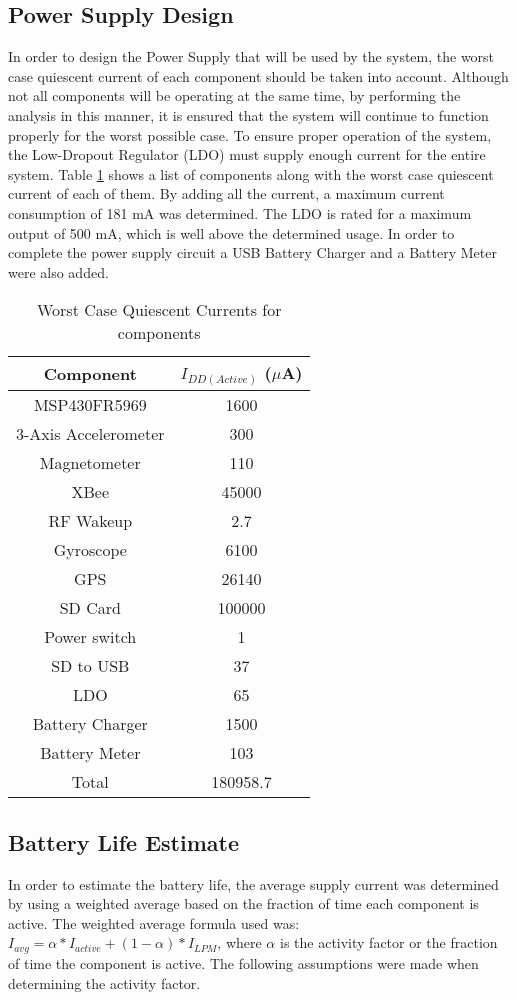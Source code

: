 \subsection{Power Supply Design}
In order to design the Power Supply that will be used by the system, the worst case quiescent current of each component should be taken into account.  Although not all components will be operating at the same time, by performing the analysis in this manner, it is ensured that the system will continue to function properly for the worst possible case.  To ensure proper operation of the system, the Low-Dropout Regulator (LDO) must supply enough current for the entire system.  Table \ref{tab:powerSupply} shows a list of components along with the worst case quiescent current of each of them.  By adding all the current, a maximum current consumption of 181 mA was determined.  The LDO is rated for a maximum output of 500 mA, which is well above the determined usage. In order to complete the power supply circuit a USB Battery Charger and a Battery Meter were also added.  
\begin{table}[H]
  \centering
  \caption{Worst Case Quiescent Currents for components}
    \begin{tabular}{|c|c|}
     \hline
    Component & $I_{DD(Active)}$ ($\mu$A) \\
     \hline \hline
    MSP430FR5969 & 1600   \\ \hline
    3-Axis Accelerometer & 300  \\ \hline
    Magnetometer & 110  \\ \hline
    XBee  & 45000 \\ \hline
    RF Wakeup & 2.7   \\ \hline
    Gyroscope & 6100  \\ \hline
    GPS   & 26140 \\ \hline
    SD Card & 100000  \\ \hline
    Power switch & 1  \\ \hline
    SD to USB & 37   \\ \hline
    LDO   & 65  \\ \hline
    Battery Charger & 1500  \\ \hline
    Battery Meter & 103   \\ \hline \hline
    Total & 180958.7  \\ \hline     
    \end{tabular}%
  \label{tab:powerSupply}%
\end{table}%

\subsection{Battery Life Estimate}
In order to estimate the battery life, the average supply current was determined by using a weighted average based on the fraction of time each component is active.  The weighted average formula used was: $I_{avg} = \alpha * I_{active} + (1 - \alpha) * I_{LPM}$, where $\alpha$ is the activity factor or the fraction of time the component is active.  The following assumptions were made when determining the activity factor.

